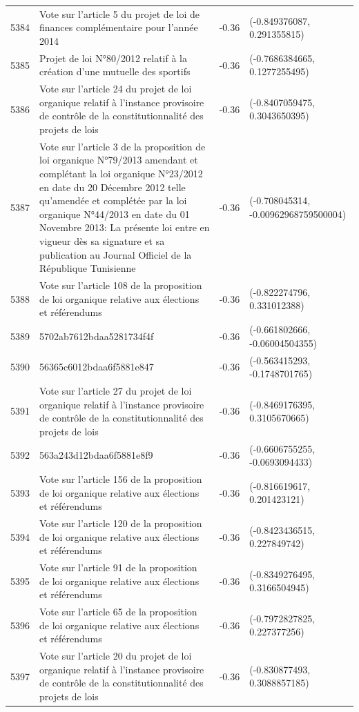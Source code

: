 \begin{table}[ht]
\begin{tabular}{rlrl}
  5384 & Vote sur l'article 5 du projet de loi de finances complémentaire pour l'année 2014 & -0.36 & (-0.849376087, 0.291355815) \\ 
  5385 & Projet de loi N°80/2012 relatif à la création d'une mutuelle des sportifs & -0.36 & (-0.7686384665, 0.1277255495) \\ 
  5386 & Vote sur l'article 24 du projet de loi organique relatif à l'instance provisoire de contrôle de la constitutionnalité des projets de lois & -0.36 & (-0.8407059475, 0.3043650395) \\ 
  5387 & Vote sur l'article 3 de la proposition de loi organique N°79/2013 amendant et complétant la loi organique N°23/2012 en date du 20 Décembre 2012 telle qu'amendée et complétée par la loi organique N°44/2013 en date du 01 Novembre 2013: La présente loi entre en vigueur dès sa signature et sa publication au Journal Officiel de la République Tunisienne & -0.36 & (-0.708045314, -0.00962968759500004) \\ 
  5388 & Vote sur l'article 108 de la proposition de loi organique relative aux élections et référendums & -0.36 & (-0.822274796, 0.331012388) \\ 
  5389 & 5702ab7612bdaa5281734f4f & -0.36 & (-0.661802666, -0.06004504355) \\ 
  5390 & 56365c6012bdaa6f5881e847 & -0.36 & (-0.563415293, -0.1748701765) \\ 
  5391 & Vote sur l'article 27 du projet de loi organique relatif à l'instance provisoire de contrôle de la constitutionnalité des projets de lois & -0.36 & (-0.8469176395, 0.3105670665) \\ 
  5392 & 563a243d12bdaa6f5881e8f9 & -0.36 & (-0.6606755255, -0.0693094433) \\ 
  5393 & Vote sur l'article 156 de la proposition de loi organique relative aux élections et référendums & -0.36 & (-0.816619617, 0.201423121) \\ 
  5394 & Vote sur l'article 120 de la proposition de loi organique relative aux élections et référendums & -0.36 & (-0.8423436515, 0.227849742) \\ 
  5395 & Vote sur l'article 91 de la proposition de loi organique relative aux élections et référendums & -0.36 & (-0.8349276495, 0.3166504945) \\ 
  5396 & Vote sur l'article 65 de la proposition de loi organique relative aux élections et référendums & -0.36 & (-0.7972827825, 0.227377256) \\ 
  5397 & Vote sur l'article 20 du projet de loi organique relatif à l'instance provisoire de contrôle de la constitutionnalité des projets de lois & -0.36 & (-0.830877493, 0.3088857185) \\ 

\end{tabular}
\end{table}
